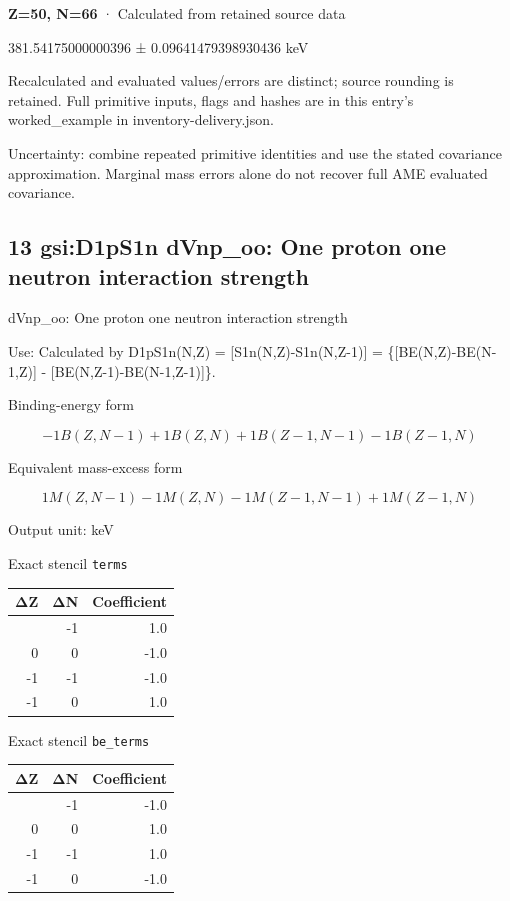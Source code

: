 \documentclass[
  11pt,
  letterpaper,
]{article}
\begin{document}
\textbf{Z=50, N=66} · Calculated from retained source data

381.54175000000396 ± 0.09641479398930436 keV

Recalculated and evaluated values/errors are distinct; source rounding
is retained. Full primitive inputs, flags and hashes are in this entry's
worked\_example in inventory-delivery.json.

Uncertainty: combine repeated primitive identities and use the stated
covariance approximation. Marginal mass errors alone do not recover full
AME evaluated covariance.

\subsection{13 gsi:D1pS1n dVnp\_oo: One proton one neutron interaction
strength}\label{gsid1ps1n-dvnp_oo-one-proton-one-neutron-interaction-strength}

dVnp\_oo: One proton one neutron interaction strength

Use: Calculated by D1pS1n(N,Z) = {[}S1n(N,Z)-S1n(N,Z-1){]} =
\{{[}BE(N,Z)-BE(N-1,Z){]} - {[}BE(N,Z-1)-BE(N-1,Z-1){]}\}.

Binding-energy form

\[
-1B(Z,N-1)+1B(Z,N)+1B(Z-1,N-1)-1B(Z-1,N)
\]

Equivalent mass-excess form

\[
1M(Z,N-1)-1M(Z,N)-1M(Z-1,N-1)+1M(Z-1,N)
\]

Output unit: keV

Exact stencil \texttt{terms}

\begin{longtable}[]{@{}rrr@{}}
\toprule\noalign{}
ΔZ & ΔN & Coefficient \\
\midrule\noalign{}
\endhead
\bottomrule\noalign{}
\endlastfoot
0 & -1 & 1.0 \\
0 & 0 & -1.0 \\
-1 & -1 & -1.0 \\
-1 & 0 & 1.0 \\
\end{longtable}

Exact stencil \texttt{be\_terms}

\begin{longtable}[]{@{}rrr@{}}
\toprule\noalign{}
ΔZ & ΔN & Coefficient \\
\midrule\noalign{}
\endhead
\bottomrule\noalign{}
\endlastfoot
0 & -1 & -1.0 \\
0 & 0 & 1.0 \\
-1 & -1 & 1.0 \\
-1 & 0 & -1.0 \\
\end{longtable}
\end{document}

